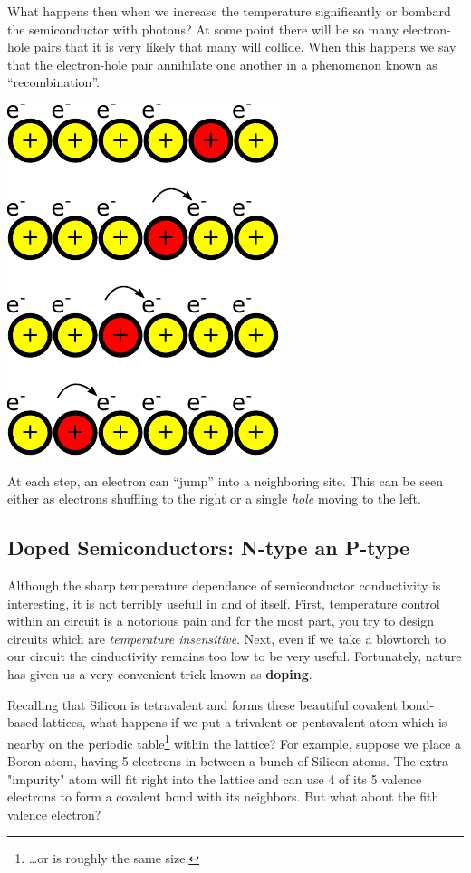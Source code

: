 \documentclass{tufte-book}
\begin{document}
What happens then when we increase the temperature significantly or bombard the semiconductor with photons? At some point there will be so many electron-hole pairs that it is very likely that many will collide. When this happens we say that the electron-hole pair annihilate one another in a phenomenon known as ``recombination''.

\begin{marginfigure}%
  \includegraphics[]{jumpin_hole}
  \caption{At each step, an electron can ``jump'' into a neighboring site. This can be seen either as electrons shuffling to the right or a single \textit{hole} moving to the left.}
  \label{fig:olez}
\end{marginfigure}

\subsection{Doped Semiconductors: N-type an P-type}
Although the sharp temperature dependance of semiconductor conductivity is interesting, it is not terribly usefull in and of itself. First, temperature control within an circuit is a notorious pain and for the most part, you try to design circuits which are \textit{temperature insensitive}. Next, even if we take a blowtorch to our circuit the cinductivity remains too low to be very useful. Fortunately, nature has given us a very convenient trick known as \textbf{doping}.

Recalling that Silicon is tetravalent and forms these beautiful covalent bond-based lattices, what happens if we put a trivalent or pentavalent atom which is nearby on the periodic table\footnote{\ldots or is roughly the same size.} within the lattice? For example, suppose we place a Boron atom, having 5 electrons in between a bunch of Silicon atoms. The extra "impurity" atom will fit right into the lattice and can use 4 of its 5 valence electrons to form a covalent bond with its neighbors. But what about the fith valence electron?
\end{document}
